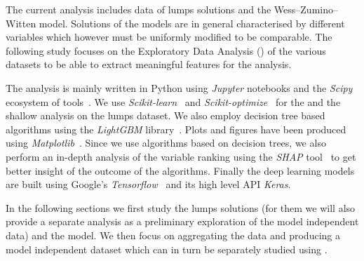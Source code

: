 The current analysis includes data of lumps solutions and the Wess--Zumino--Witten  model.
Solutions of the models are in general characterised by different variables which however must be uniformly modified to be comparable.
The following study focuses on the Exploratory Data Analysis (\eda) of the various datasets to be able to extract meaningful features for the \ml analysis.

The analysis is mainly written in Python using \emph{Jupyter} notebooks and the \emph{Scipy} ecosystem of tools~\Cite{Virtanen:2020:SciPyFundamentalAlgorithms}.
We use \emph{Scikit-learn}~\Cite{Pedregosa:2011:ScikitlearnMachineLearning} and \emph{Scikit-optimize}~\Cite{Head:2018:ScikitoptimizeScikitoptimizeV0} for the \eda and the shallow \ml analysis on the lumps dataset.
We also employ decision tree based algorithms using the \emph{LightGBM} library~\Cite{Ke:2017:LightGBMHighlyEfficient}.
Plots and figures have been produced using \emph{Matplotlib}~\Cite{Hunter:2007:Matplotlib2DGraphics}.
Since we use algorithms based on decision trees, we also perform an in-depth analysis of the variable ranking using the \emph{SHAP} tool~\Cite{Lundberg:2020:LocalExplanationsGlobal} to get better insight of the outcome of the algorithms.
Finally the deep learning models are built using Google's \emph{Tensorflow}~\Cite{Abadi:2015:TensorFlowLargescaleMachine} and its high level API \emph{Keras}.

In the following sections we first study the lumps solutions (for them we will also provide a separate \ml analysis as a preliminary exploration of the model independent data) and the \wzw model.
We then focus on aggregating the data and producing a model independent dataset which can in turn be separately studied using \ml.
